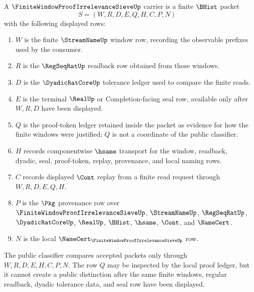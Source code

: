 \begin{definition}
\label{def:finite-window-proof-irrelevance-sieve-carrier}
A $\FiniteWindowProofIrrelevanceSieveUp$ carrier is a finite $\BHist$ packet
$$
S=(W,R,D,E,Q,H,C,P,N)
$$
with the following displayed rows:
\begin{enumerate}
\item $W$ is the finite $\StreamNameUp$ window row, recording the observable prefixes used by the consumer.
\item $R$ is the $\RegSeqRatUp$ readback row obtained from those windows.
\item $D$ is the $\DyadicRatCoreUp$ tolerance ledger used to compare the finite reads.
\item $E$ is the terminal $\RealUp$ or Completion-facing seal row, available only after $W,R,D$ have been displayed.
\item $Q$ is the proof-token ledger retained inside the packet as evidence for how the finite windows were justified; $Q$ is not a coordinate of the public classifier.
\item $H$ records componentwise $\hsame$ transport for the window, readback, dyadic, seal, proof-token, replay, provenance, and local naming rows.
\item $C$ records displayed $\Cont$ replay from a finite read request through $W,R,D,E,Q,H$.
\item $P$ is the $\Pkg$ provenance row over $\FiniteWindowProofIrrelevanceSieveUp$, $\StreamNameUp$, $\RegSeqRatUp$, $\DyadicRatCoreUp$, $\RealUp$, $\BHist$, $\hsame$, $\Cont$, and $\NameCert$.
\item $N$ is the local $\NameCert_{\FiniteWindowProofIrrelevanceSieveUp}$ row.
\end{enumerate}
The public classifier compares accepted packets only through $W,R,D,E,H,C,P,N$. The row $Q$ may be inspected by the local proof ledger, but it cannot create a public distinction after the same finite windows, regular readback, dyadic tolerance data, and seal row have been displayed.
\end{definition}

